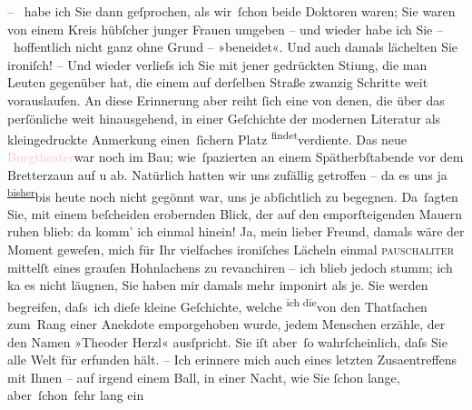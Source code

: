 \pstart
           – \label{K_L03901-5v}\label{K_L03901-5} habe ich
               Sie dann geſprochen, als wir ſchon beide Doktoren waren; Sie waren von einem Kreis
               hübſcher junger Frauen umgeben – und wieder habe ich Sie – hoffentlich nicht ganz
               ohne Grund – »beneidet«. Und auch damals lächelten Sie ironiſch! – Und wieder
               verlieſs ich {\pb}Sie mit jener gedrückten Sti{\geminationm}ung, die man Leuten gegenüber hat, die einem auf
               derſelben Straße zwanzig Schritte weit vorauslaufen. An diese Erinnerung aber reiht
               ſich eine von denen, die über das perſönliche weit hinausgehend, in einer Geſchichte
               der modernen Literatur als kleingedruckte Anmerkung einen ſichern Platz \substVorne{}\textsuperscript{findet}\substDazwischen{}verdiente\substHinten{}. Das neue \textcolor{pink}{Burgtheater}\ledrightnote{\textcolor{pink}{Burgtheater}}{ }{\pb}war noch im Bau; wie ſpazierten an einem Spätherbſtabende
               vor dem Bretterzaun auf u ab. Natürlich hatten wir uns zufällig getroffen – da es
               uns ja \substVorne{}\textsuperscript{\uline{bisher}}\substDazwischen{}bis heute\substHinten{} noch nicht gegönnt war, uns je abſichtlich zu begegnen. Da ſagten Sie, mit
               einem beſcheiden erobernden Blick, der auf den emporſteigenden Mauern ruhen blieb: da
               komm’ ich einmal hinein! {\pb}Ja, mein lieber Freund, damals
               wäre der Moment geweſen, mich für Ihr vielfaches ironiſches Lächeln einmal \textsc{pauschaliter} mittelſt eines grauſen Hohnlachens zu
               revanchiren – ich blieb jedoch stumm; ich ka{\geminationn} es
                  \introOben{}nicht\introOben{} läugnen, Sie haben mir damals mehr imponirt als je. Sie werden
               begreifen, daſs ich dieſe kleine Geſchichte, welche \substVorne{}\textsuperscript{ich die}\substDazwischen{}von den\substHinten{} Thatſachen zum Rang {\pb}einer Anekdote emporgehoben
               wurde, jedem Menschen erzähle, der den Namen »Theoder Herzl« ausſpricht. Sie iſt
               aber ſo wahrſcheinlich, daſs Sie alle Welt für erfunden hält. – Ich erinnere mich
               auch eines letzten Zusa{\geminationm}entreffens mit Ihnen – auf
               irgend einem Ball, in einer Nacht, wie Sie ſchon lange, aber ſchon ſehr lang ein
